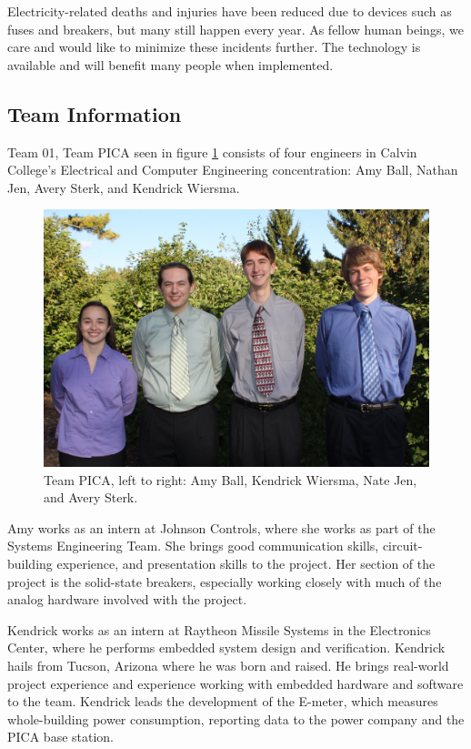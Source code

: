 Electricity-related deaths and injuries have been reduced due to devices such as fuses and breakers, but many still happen every year. As fellow human beings, we care and would like to minimize these incidents further. The technology is available and will benefit many people when implemented.

\subsection{Team Information}

Team 01, Team PICA seen in figure \ref{fig:teamphoto} consists of four engineers in Calvin College's Electrical and Computer Engineering concentration: Amy Ball, Nathan Jen, Avery Sterk, and Kendrick Wiersma.

\begin{figure}[htbp]
\begin{center}
\includegraphics[width=6in]{figures/IMG_0865}
\caption{Team PICA, left to right: Amy Ball, Kendrick Wiersma, Nate Jen, and Avery Sterk.}
\label{fig:teamphoto}
\end{center}
\end{figure}

Amy works as an intern at Johnson Controls, where she works as part of the Systems Engineering Team. She brings good communication skills, circuit-building experience, and presentation skills to the project. Her section of the project is the solid-state breakers, especially working closely with much of the analog hardware involved with the project.

Kendrick works as an intern at Raytheon Missile Systems in the Electronics Center, where he performs embedded system design and verification. Kendrick hails from Tucson, Arizona where he was born and raised. He brings real-world project experience and experience working with embedded hardware and software to the team. Kendrick leads the development of the E-meter, which measures whole-building power consumption, reporting data to the power company and the PICA base station.


